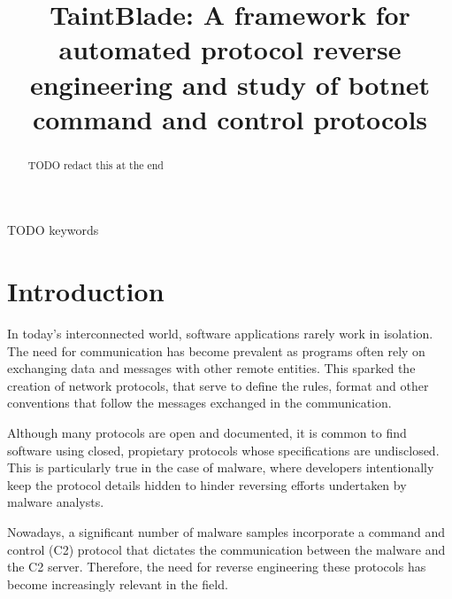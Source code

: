 \documentclass[conference]{IEEEtran}
\begin{document}
\title{TaintBlade: A framework for automated protocol reverse engineering and study of botnet command and control protocols
}

\author{
    \and
}

\maketitle

\begin{abstract}
    TODO redact this at the end
\end{abstract}

\begin{IEEEkeywords}
    TODO keywords
\end{IEEEkeywords}

\section{Introduction}
In today's interconnected world, software applications rarely work in
isolation. The need for communication has become prevalent as programs often
rely on exchanging data and messages with other remote entities. This sparked
the creation of network protocols, that serve to define the rules, format and
other conventions that follow the messages exchanged in the communication.

Although many protocols are open and documented, it is common to find software
using closed, propietary protocols whose specifications are undisclosed. This
is particularly true in the case of malware, where developers intentionally
keep the protocol details hidden to hinder reversing efforts undertaken by
malware analysts.

Nowadays, a significant number of malware samples incorporate a command and
control (C2) protocol that dictates the communication between the malware and
the C2 server. Therefore, the need for reverse engineering these protocols has
become increasingly relevant in the field.
\end{document}
